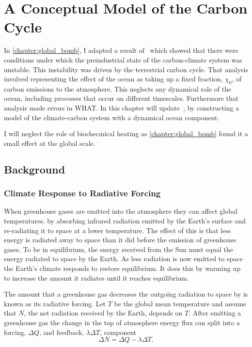 \chapter{A Conceptual Model of the Carbon Cycle}
\label{chapter:conceptual_carbon_cycle}
\graphicspath{{box_ocean/figs/}}

In \cref{chapter:global_bomb}, I adapted a result of~\cite{Cox2006} which showed that there were conditions under which the preindustrial state of the carbon-climate
system was unstable. This instability was driven by the terrestrial carbon cycle. That analysis involved representing the effect of the ocean as taking up a fixed fraction,
$\chi_0$, of carbon emissions to the atmosphere. This neglects any dynamical role of the ocean, including processes that occur on different timescales. Furthermore that analysis
made errors in WHAT. In this chapter will update~\cite{Cox2006}, by constructing a model of the climate-carbon system with a dynamical ocean component.

I will neglect the role of biochecmical heating as \cref{chapter:global_bomb} found it a small effect at the global scale.

\section{Background}

\subsection{Climate Response to Radiative Forcing}
When greenhouse gases are emitted into the atmosphere they can affect global temperatures.
by absorbing infrared radiation emitted by the Earth's surface and re-radiating it to space at a lower temperature.
The effect of this is that less energy is radiated away to space than it did before the emission of greenhouse gases. To be in
equilibrium, the energy received from the Sun must equal the energy radiated to space by the Earth. As less radiation is now
emitted to space the Earth's climate responds to restore equilibrium. It does this by warming up to increase the amount it
radiates until it reaches equilibrium.

The amount that a greenhouse gas decreases the outgoing radiation to space by is known as its radiative forcing. Let $T$ be
the global mean temperature and assume that $N$, the net radiation received by the Earth, depends on $T$. After emitting a greenhouse gas
the change in the top of atmosphere energy flux can split into a forcing, $\Delta Q$, and feedback, $\lambda \Delta T$, component
\begin{equation}
  \label{eq:deltaN}
  \Delta N = \Delta Q - \lambda \Delta T.
\end{equation}

